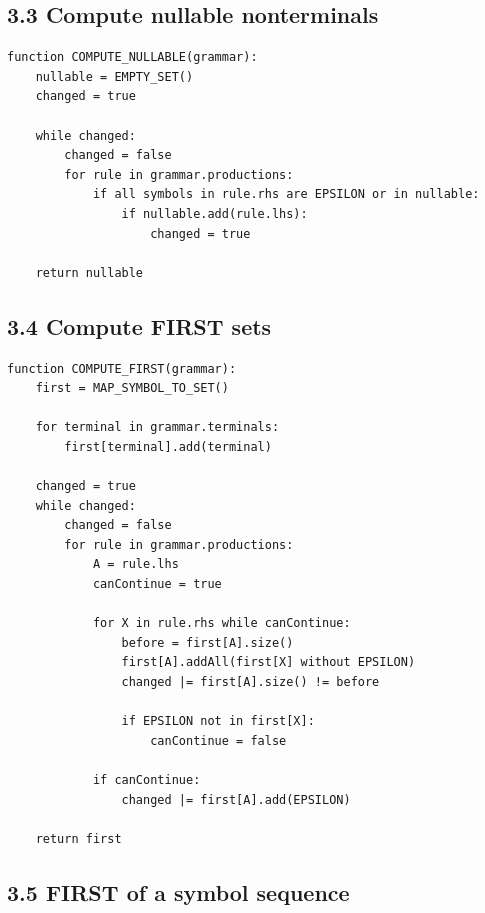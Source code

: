 \documentclass[10pt,letterpaper]{article}
\begin{document}
\subsection*{3.3 Compute nullable nonterminals}
{}

\begin{verbatim}
function COMPUTE_NULLABLE(grammar):
    nullable = EMPTY_SET()
    changed = true

    while changed:
        changed = false
        for rule in grammar.productions:
            if all symbols in rule.rhs are EPSILON or in nullable:
                if nullable.add(rule.lhs):
                    changed = true

    return nullable
\end{verbatim}

\subsection*{3.4 Compute FIRST sets}
{}

\begin{verbatim}
function COMPUTE_FIRST(grammar):
    first = MAP_SYMBOL_TO_SET()

    for terminal in grammar.terminals:
        first[terminal].add(terminal)

    changed = true
    while changed:
        changed = false
        for rule in grammar.productions:
            A = rule.lhs
            canContinue = true

            for X in rule.rhs while canContinue:
                before = first[A].size()
                first[A].addAll(first[X] without EPSILON)
                changed |= first[A].size() != before

                if EPSILON not in first[X]:
                    canContinue = false

            if canContinue:
                changed |= first[A].add(EPSILON)

    return first
\end{verbatim}

\subsection*{3.5 FIRST of a symbol sequence}
{}
\end{document}
